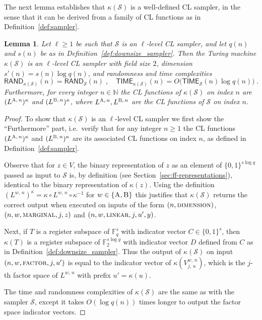 \documentclass[11pt]{article}
\newtheorem{lemma}[theorem]{Lemma}
\theoremstyle{definition}
\newcommand{\N}{\ensuremath{\mathbb{N}}}
\newcommand{\F}{\ensuremath{\mathbb{F}}}
\newcommand{\downsize}{\kappa}
\newcommand{\sampler}{\mathcal{S}}
\newcommand{\gamestyle}[1]{\ensuremath{\textsc{#1}}\xspace}
\newcommand{\labelstyle}[1]{\ensuremath{\textsc{#1}}\xspace}
\newcommand{\alice}{\labelstyle{A}}
\newcommand{\bob}{\labelstyle{B}}
\newcommand{\ab}{\{\alice, \bob\}}
\newcommand{\TIME}{\mathsf{TIME}}
\newcommand{\RAND}{\mathsf{RAND}}
\begin{document}
The next lemma establishes that $\downsize(\sampler)$ is a well-defined CL
sampler, in the sense that it can be derived from a family of CL functions as in
Definition~\ref{def:sampler}.

\begin{lemma}
  \label{lem:downsize_sampler}
  Let $\ell \geq 1$ be such that $\sampler$ is an $\ell$-level CL sampler, and
  let $q(n)$ and $s(n)$ be as in Definition~\ref{def:downsize_sampler}.
  Then the Turing machine $\downsize(\sampler)$ is an $\ell$-level CL sampler
  with field size $2$, dimension $s'(n) = s(n) \log q(n)$, and randomness and
  time complexities
  \begin{equation*}
    \RAND_{\downsize(\sampler)}(n) = \RAND_\sampler(n)\;,\quad
    \TIME_{\downsize(\sampler)}(n) = O \bigl( \TIME_\sampler(n) \log q(n) \bigr)\;.
  \end{equation*}
  Furthermore, for every integer $n \in \N$ the CL functions of
  $\downsize(\sampler)$ on index $n$ are $(L^{\alice,\, n})^\downsize$ and
  $(L^{\bob,\, n})^\downsize$, where $L^{\alice,\, n}, L^{\bob,\, n}$ are the CL
  functions of $\sampler$ on index $n$.
\end{lemma}

\begin{proof} 
  To show that $\downsize(\sampler)$ is an $\ell$-level CL sampler we first show
  the ``Furthermore'' part, i.e.\ verify that for any integer $n\geq 1$ the CL
  functions $(L^{\alice,\, n})^\downsize$ and $(L^{\bob,\, n})^\downsize$ are its
  associated CL functions on index $n$, as defined in
  Definition~\ref{def:sampler}.

  Observe that for $z\in V$, the binary representation of $z$ as an element of
  $\{0,1\}^{s\log q}$ passed as input to $\sampler$ is, by definition (see
  Section~\ref{sec:ff-representations}), identical to the binary representation
  of $\downsize(z)$.
  Using the definition $(L^{w,\, n})^\downsize = \downsize \circ L^{w,\, n}
  \circ \downsize^{-1}$ for $w \in \ab$ this justifies that
  $\downsize(\sampler)$ returns the correct output when executed on inputs of
  the form $(n,\gamestyle{dimension})$, $(n,w,\gamestyle{marginal},j,z)$ and $(n, w, \gamestyle{linear}, j, u', y)$.

  Next, if $T$ is a register subspace of $\F_q^s$ with indicator vector $C \in
  \{0,1\}^s$, then $\downsize(T)$ is a register subspace of $\F_2^{s\log q}$
  with indicator vector $D$ defined from $C$ as in
  Definition~\ref{def:downsize_sampler}.
  Thus the output of $\downsize(\sampler)$ on input $(n, w, \gamestyle{factor},
  j, u')$ is equal to the indicator vector of $\downsize(V^{w,\, n}_{j,\, u})$,
  which is the $j$-th factor space of $L^{w,\, n}$ with prefix $u' =
  \downsize(u)$.

  The time and randomness complexities of $\downsize(\sampler)$ are the same as
  with the sampler $\sampler$, except it takes $O(\log q(n))$ times longer to
  output the factor space indicator vectors.

\end{proof}
\end{document}
